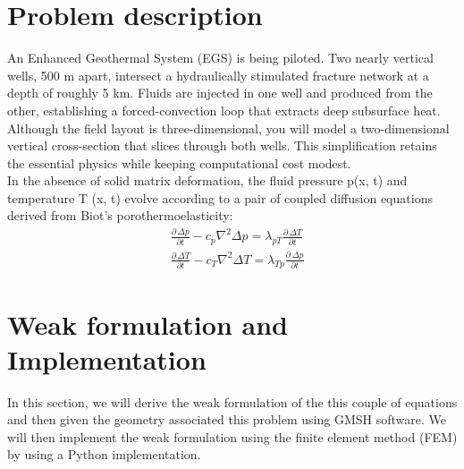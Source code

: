 \documentclass[a4paper,12pt]{report}
\begin{document}


\newpage
\tableofcontents
\newpage
\renewcommand{\thesection}{\arabic{section}} %
\setcounter{section}{0} 
\section{Problem description}
An Enhanced Geothermal System (EGS) is being piloted. Two nearly vertical wells, 500 m
apart, intersect a hydraulically stimulated fracture network at a depth of roughly 5 km. Fluids
are injected in one well and produced from the other, establishing a forced-convection loop
that extracts deep subsurface heat.
Although the field layout is three-dimensional, you will model a two-dimensional vertical
cross-section that slices through both wells. This simplification retains the
essential physics while keeping computational cost modest.\\
In the absence of solid matrix deformation, the fluid pressure p(x, t) and temperature T (x, t)
evolve according to a pair of coupled diffusion equations derived from Biot’s
porothermoelasticity:
\begin{align}
&\frac{\partial\, \Delta p}{\partial t} - c_p \nabla^2 \Delta p = \lambda_{pT} \frac{\partial\, \Delta T}{\partial t} \\
    &\frac{\partial\, \Delta T}{\partial t} - c_T \nabla^2 \Delta T = \lambda_{Tp} \frac{\partial\, \Delta p}{\partial t}
\end{align}

\section{Weak formulation and Implementation}
In this section, we will derive the weak formulation of the  this couple of equations
and then given the geometry associated this problem using GMSH software. We will then implement the weak
formulation using the finite element method (FEM) by using a Python implementation.
\end{document}
